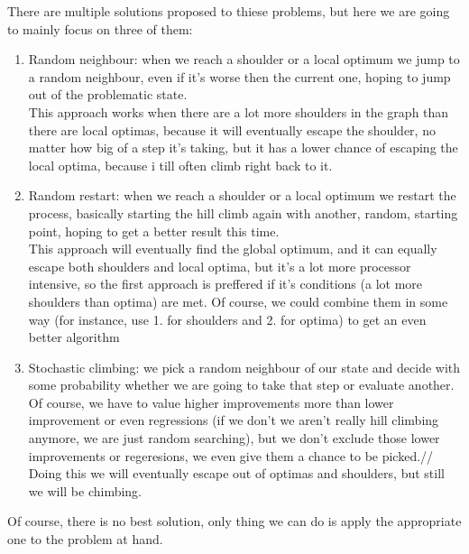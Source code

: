 \documentclass[10pt,a4paper]{article}
\begin{document}
		There are multiple solutions proposed to thiese problems, but here we are going to mainly focus on three of them:
		\begin{enumerate}
			\item Random neighbour: when we reach a shoulder or a local optimum we jump to a random neighbour, even if it's worse then the current one, hoping to jump out of the problematic state. \\
				This approach works when there are a lot more shoulders in the graph than there are local optimas, because it will eventually escape the shoulder, no matter how big of a step it's taking, but it has a lower chance of escaping the local optima, because i till often climb right back to it.
			\item Random restart: when we reach a shoulder or a local optimum we restart the process, basically starting the hill climb again with another, random, starting point, hoping to get a better result this time. \\
				This approach will eventually find the global optimum, and it can equally escape both shoulders and local optima, but it's a lot more processor intensive, so the first approach is preffered if it's conditions (a lot more shoulders than optima) are met. Of course, we could combine them in some way (for instance, use 1. for shoulders and 2. for optima) to get an even better algorithm
			\item Stochastic climbing: we pick a random neighbour of our state and decide with some probability whether we are going to take that step or evaluate another. Of course, we have to value higher improvements more than lower improvement or even regressions (if we don't we aren't really hill climbing anymore, we are just random searching), but we don't exclude those lower improvements or regeresions, we even give them a chance to be picked.//
				Doing this we will eventually escape out of optimas and shoulders, but still we will be chimbing.
		\end{enumerate}
		Of course, there is no best solution, only thing we can do is apply the appropriate one to the problem at hand.
	\pagebreak
\end{document}
